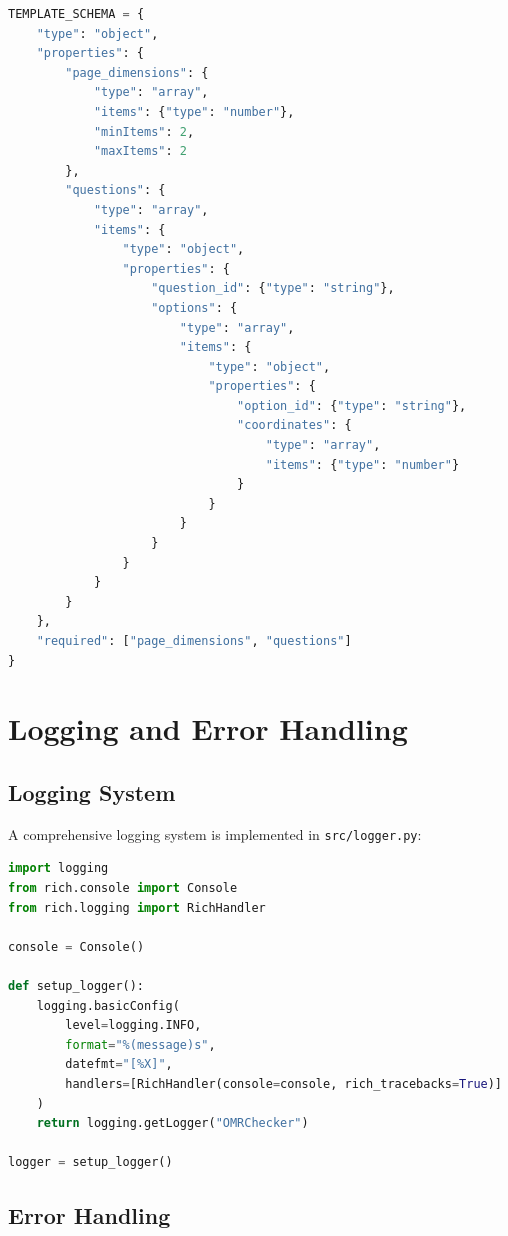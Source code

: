 \begin{lstlisting}[language=Python, caption=Configuration Schema]
TEMPLATE_SCHEMA = {
    "type": "object",
    "properties": {
        "page_dimensions": {
            "type": "array",
            "items": {"type": "number"},
            "minItems": 2,
            "maxItems": 2
        },
        "questions": {
            "type": "array",
            "items": {
                "type": "object",
                "properties": {
                    "question_id": {"type": "string"},
                    "options": {
                        "type": "array",
                        "items": {
                            "type": "object",
                            "properties": {
                                "option_id": {"type": "string"},
                                "coordinates": {
                                    "type": "array",
                                    "items": {"type": "number"}
                                }
                            }
                        }
                    }
                }
            }
        }
    },
    "required": ["page_dimensions", "questions"]
}
\end{lstlisting}

\section{Logging and Error Handling}

\subsection{Logging System}

A comprehensive logging system is implemented in \texttt{src/logger.py}:

\begin{lstlisting}[language=Python, caption=Logging Implementation]
import logging
from rich.console import Console
from rich.logging import RichHandler

console = Console()

def setup_logger():
    logging.basicConfig(
        level=logging.INFO,
        format="%(message)s",
        datefmt="[%X]",
        handlers=[RichHandler(console=console, rich_tracebacks=True)]
    )
    return logging.getLogger("OMRChecker")

logger = setup_logger()
\end{lstlisting}

\subsection{Error Handling}


